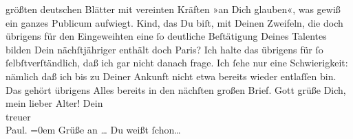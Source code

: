\begin{ledgroupsized}[t]{13cm}
               größten deutschen Blätter mit vereinten Kräften »an Dich glauben«, was gewiß ein ganzes Publicum
               aufwiegt. Kind, das Du biſt, mit Deinen Zweifeln, die doch übrigens für den
               Eingeweihten eine ſo deutliche Beſtätigung Deines Talentes bilden{\dotsfour}\pend
           \pstart
           {\pb}Dein nächſtjähriger \label{K_L02671-2v}\label{K_L02671-2h} enthält doch Paris? Ich
               halte das übrigens für ſo ſelbſtverſtändlich, daß ich gar nicht danach frage. Ich
               ſehe nur eine Schwierigkeit: nämlich daß ich bis zu Deiner Ankunft nicht etwa bereits
               wieder entlaſſen bin.\pend
           \pstart
           Das gehört übrigens Alles bereits in den nächſten großen Brief. Gott grüße Dich, mein
               lieber Alter!\pend
           \pstart
           Dein {\\[\baselineskip]}treuer {\\[\baselineskip]}\spacefill\mbox{Paul.}\pend
           \leftskip=0em{}\pstart
           \noindent{}Grüße an {\dots}{ } Du weißt ſchon{\dots}\pend
           
         
         \endnumbering{}\end{ledgroupsized}  \newcommand{\dateiname}{L02671}\newcommand{\titel}{Paul Goldmann an Arthur Schnitzler, 22. 11. [1891]}\newcommand{\editorInnen}{Martin Anton Müller und Laura Untner}
      
